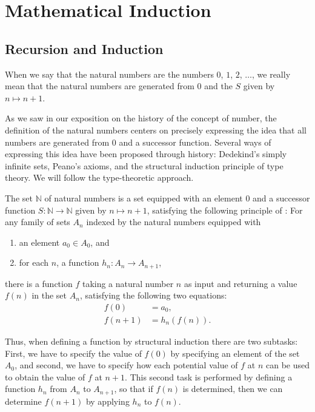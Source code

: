 \chapter{Mathematical Induction}

\section{Recursion and Induction}

When we say that the natural numbers are the numbers $0$, $1$, $2$, $\ldots$, we really mean that the natural numbers are generated from $0$ and the  $S$ given by $n\mapsto n+1$.

As we saw in our exposition on the history of the concept of number, the definition of the natural numbers centers on precisely expressing the idea that all numbers are generated from $0$ and a successor function. Several ways of expressing this idea have been proposed through history: Dedekind's simply infinite sets, Peano's axioms, and the structural induction principle of type theory. We will follow the type-theoretic approach.

\begin{definition}
  The set $\mathbb{N}$ of natural numbers is a set equipped with an element $0$ and a successor function $S:\mathbb{N}\to\mathbb{N}$ given by $n\mapsto n+1$, satisfying the following principle of : For any family of sets $A_n$ indexed by the natural numbers equipped with
  \begin{enumerate}
  \item an element $a_0\in A_0$, and
  \item for each $n$, a function $h_n:A_n\to A_{n+1}$,
  \end{enumerate}
  there is a function $f$ taking a natural number $n$ as input and returning a value $f(n)$ in the set $A_n$, satisfying the following two equations:
  \begin{align*}
    f(0) & = a_0, \\
    f(n+1) & = h_n(f(n)).
  \end{align*}
\end{definition}

Thus, when defining a function by structural induction there are two subtasks: First, we have to specify the value of $f(0)$ by specifying an element of the set $A_0$, and second, we have to specify how each potential value of $f$ at $n$ can be used to obtain the value of $f$ at $n+1$. This second task is performed by defining a function $h_n$ from $A_n$ to $A_{n+1}$, so that if $f(n)$ is determined, then we can determine $f(n+1)$ by applying $h_n$ to $f(n)$.

